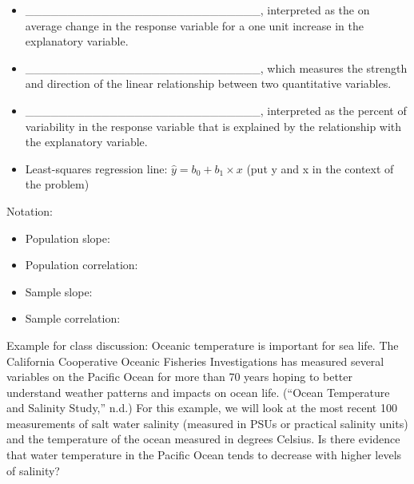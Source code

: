 \documentclass[
]{report}
\providecommand{\tightlist}{%
  \setlength{\itemsep}{0pt}\setlength{\parskip}{0pt}}
\begin{document}
\begin{itemize}
\tightlist
\item
  \_\_\_\_\_\_\_\_\_\_\_\_\_\_\_\_\_\_\_\_\_\_\_\_\_\_\_\_, interpreted as the on average change in the response variable for a one unit increase in the explanatory variable.
\end{itemize}

\vspace{1mm}

\begin{itemize}
\tightlist
\item
  \_\_\_\_\_\_\_\_\_\_\_\_\_\_\_\_\_\_\_\_\_\_\_\_\_\_\_\_, which measures the strength and direction of the linear relationship between two quantitative variables.
\end{itemize}

\vspace{1mm}

\begin{itemize}
\tightlist
\item
  \_\_\_\_\_\_\_\_\_\_\_\_\_\_\_\_\_\_\_\_\_\_\_\_\_\_\_\_, interpreted as the percent of variability in the response variable that is explained by the relationship with the explanatory variable.
\end{itemize}

\vspace{1mm}


\begin{itemize}
\tightlist
\item
  Least-squares regression line: \(\hat{y}=b_0+b_1\times x\) (put y and x in the context of the problem)
\end{itemize}


Notation:

\begin{itemize}
\item
  Population slope:
\item
  Population correlation:
\item
  Sample slope:
\item
  Sample correlation:
\end{itemize}


Example for class discussion: Oceanic temperature is important for sea life. The California Cooperative Oceanic Fisheries Investigations has measured several variables on the Pacific Ocean for more than 70 years hoping to better understand weather patterns and impacts on ocean life. ({``Ocean Temperature and Salinity Study,''} n.d.) For this example, we will look at the most recent 100 measurements of salt water salinity (measured in PSUs or practical salinity units) and the temperature of the ocean measured in degrees Celsius. Is there evidence that water temperature in the Pacific Ocean tends to decrease with higher levels of salinity?
\end{document}
